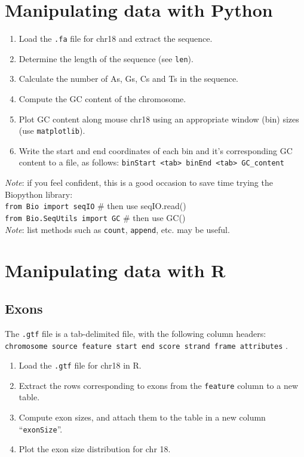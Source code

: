 \documentclass[a4paper,11pt]{article}
\begin{document}
\section{Manipulating data with Python}
\begin{enumerate}
\item Load the \texttt{.fa} file for chr18 and extract the sequence.
\item Determine the length of the sequence (see \texttt{len}).
\item Calculate the number of As, Gs, Cs and Ts in the sequence.
\item Compute the GC content of the chromosome.
\item Plot GC content along mouse chr18 using an appropriate window (bin) sizes (use \texttt{matplotlib}).
\item Write the start and end coordinates of each bin and it's corresponding GC content to a file, as follows:
\texttt {binStart <tab> binEnd <tab> GC\_content}
\end{enumerate}
\textit{Note}: if you feel confident, this is a good occasion to save time trying the Biopython library: \\
\texttt{from Bio import seqIO} \# then use seqIO.read()\\
\texttt{from Bio.SeqUtils import GC} \# then use GC() \\
\textit{Note}: list methods such as \texttt{count}, \texttt{append}, etc. may be useful.



\section{Manipulating data with R}
\subsection{Exons}
The \texttt{.gtf} file is a tab-delimited file, with the following column headers: \\
\texttt {chromosome source feature start end score strand frame attributes} .
\begin{enumerate}
\item Load the \texttt{.gtf} file for chr18 in R.
\item Extract the rows corresponding to exons from the \texttt{feature} column to a new table.
\item Compute exon sizes, and attach them to the table in a new column ``\texttt{exonSize}''.
\item Plot the exon size distribution for chr 18.
\end{enumerate}
\end{document}
